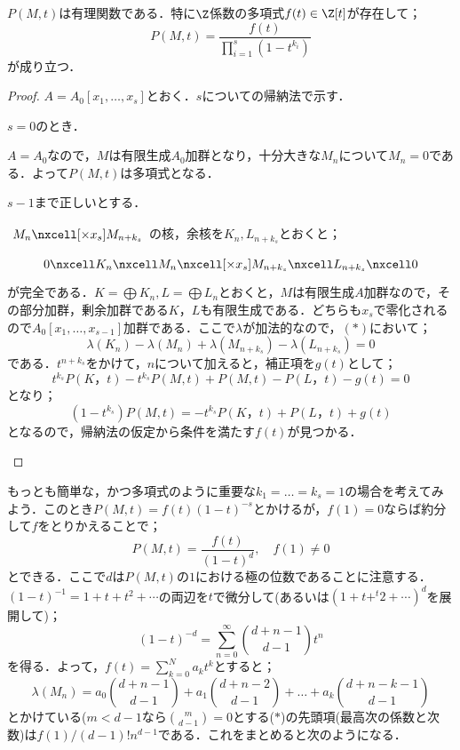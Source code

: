 \begin{thm}
	$P(M,t)$は有理関数である．特に$\Z$係数の多項式$f(t)\in\Z[t]$が存在して；
	\[P(M,t)=\frac{f(t)}{\prod_{i=1}^s(1-t^{k_i})}\]
	が成り立つ．
\end{thm}

\begin{proof}
	$A=A_0[x_1,\dots,x_s]$とおく．$s$についての帰納法で示す．
	\begin{step}
		\item $s=0$のとき．
		
		$A=A_0$なので，$M$は有限生成$A_0$加群となり，十分大きな$M_n$について$M_n=0$である．よって$P(M,t)$は多項式となる．
		
		\item $s-1$まで正しいとする．
		
		$\begin{tikzcd}
			M_n\nxcell[\times x_s]M_{n+k_s}
		\end{tikzcd}$の核，余核を$K_n,L_{n+k_s}$とおくと；
		\[\begin{tikzcd}
			0\nxcell K_n\nxcell M_n\nxcell[\times x_s]M_{n+k_s}\nxcell L_{n+k_s}\nxcell0
		\end{tikzcd}\]
		が完全である．$K=\bigoplus K_n,L=\bigoplus L_n$とおくと，$M$は有限生成$A$加群なので，その部分加群，剰余加群である$K，L$も有限生成である．どちらも$x_s$で零化されるので$A_0[x_1,\dots,x_{s-1}]$加群である．ここで$\lambda$が加法的なので，$(\ast)$において；
		\[\lambda(K_n)-\lambda(M_n)+\lambda(M_{n+k_s})-\lambda(L_{n+k_s})=0\]
		である．$t^{n+k_s}$をかけて，$n$について加えると，補正項を$g(t)$として；
		\[t^{k_s}P(K，t)-t^{k_s}P(M,t)+P(M,t)-P(L，t)-g(t)=0\]
		となり；
		\[(1-t^{k_s})P(M,t)=-t^{k_s}P(K，t)+P(L，t)+g(t)\]
		となるので，帰納法の仮定から条件を満たす$f(t)$が見つかる．
	\end{step}
\end{proof}

もっとも簡単な，かつ多項式のように重要な$k_1=\dots=k_s=1$の場合を考えてみよう．このとき$P(M,t)=f(t)(1-t)^{-s}$とかけるが，$f(1)=0$ならば約分して$f$をとりかえることで；
\[P(M,t)=\frac{f(t)}{(1-t)^d},\quad f(1)\neq0\]
とできる．ここで$d$は$P(M,t)$の$1$における極の位数であることに注意する．$(1-t)^{-1}=1+t+t^2+\cdots$の両辺を$t$で微分して(あるいは$(1+t+^t2+\cdots)^{d}$を展開して)；
\[(1-t)^{-d}=\sum_{n=0}^\infty\binom{d+n-1}{d-1} t^n\]
を得る．よって，$f(t)=\sum_{k=0}^N a_kt^k$とすると；
\[\lambda(M_n)=a_0\binom{d+n-1}{d-1}+a_1\binom{d+n-2}{d-1}+\dots+a_k\binom{d+n-k-1}{d-1}\tag{$\ast$}\]
とかけている($m<d-1$なら$\binom{m}{d-1}=0$とする($\ast$)の先頭項(最高次の係数と次数)は$f(1)/(d-1)! n^{d-1}$である．これをまとめると次のようになる．

